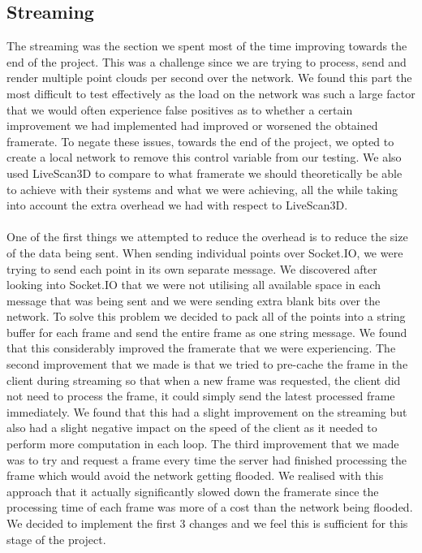 \documentclass{article}
\begin{document}
\subsection{Streaming}
The streaming was the section we spent most of the time improving towards the end of the project. This was a challenge since we are trying to process, send and render multiple point clouds per second over the network. We found this part the most difficult to test effectively as the load on the network was such a large factor that we would often experience false positives as to whether a certain improvement we had implemented had improved or worsened the obtained framerate. To negate these issues, towards the end of the project, we opted to create a local network to remove this control variable from our testing. We also used LiveScan3D to compare to what framerate we should theoretically be able to achieve with their systems and what we were achieving, all the while taking into account the extra overhead we had with respect to LiveScan3D.
\\\\
One of the first things we attempted to reduce the overhead is to reduce the size of the data being sent. When sending individual points over Socket.IO, we were trying to send each point in its own separate message. We discovered after looking into Socket.IO that we were not utilising all available space in each message that was being sent and we were sending extra blank bits over the network. To solve this problem we decided to pack all of the points into a string buffer for each frame and send the entire frame as one string message. We found that this considerably improved the framerate that we were experiencing. The second improvement that we made is that we tried to pre-cache the frame in the client during streaming so that when a new frame was requested, the client did not need to process the frame, it could simply send the latest processed frame immediately. We found that this had a slight improvement on the streaming but also had a slight negative impact on the speed of the client as it needed to perform more computation in each loop. The third improvement that we made was to try and request a frame every time the server had finished processing the frame which would avoid the network getting flooded. We realised with this approach that it actually significantly slowed down the framerate since the processing time of each frame was more of a cost than the network being flooded. We decided to implement the first 3 changes and we feel this is sufficient for this stage of the project.
\end{document}
